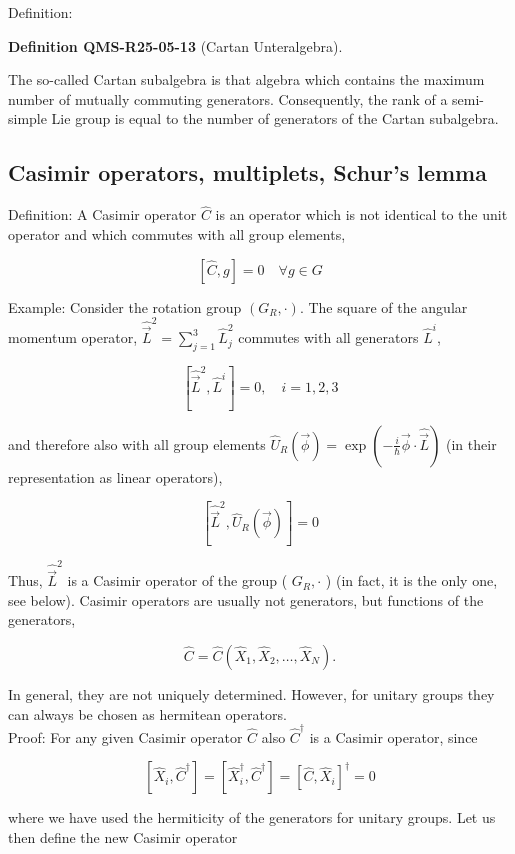 \documentclass[10pt, letterpaper]{article}
\newcommand{\CustomHeading}[3]{%
  \par\medskip\noindent%
  \textbf{#1 #2} \textnormal{(#3)}.\enskip%
}
\newenvironment{DEF}[2]{\begin{unitbox}\CustomHeading{Definition}{#1}{#2}}{\end{unitbox}}
\begin{document}
Definition: 


\begin{DEF}{QMS-R25-05-13}{Cartan Unteralgebra}
The so-called Cartan subalgebra is that algebra which contains the maximum number of mutually commuting generators. Consequently, the rank of a semi-simple Lie group is equal to the number of generators of the Cartan subalgebra.
\end{DEF}




\subsection{Casimir operators, multiplets, Schur's lemma}


Definition: A Casimir operator $\hat{C}$ is an operator which is not identical to the unit operator and which commutes with all group elements,

$$
[\hat{C}, g]=0 \quad \forall g \in G
$$

Example: Consider the rotation group $\left(G_{R}, \cdot\right)$. The square of the angular momentum operator, $\hat{\vec{L}}^{2}=\sum_{j=1}^{3} \hat{L}_{j}^{2}$ commutes with all generators $\hat{L}^{i}$,

$$
\left[\hat{\vec{L}}^{2}, \hat{L}^{i}\right]=0, \quad i=1,2,3
$$

and therefore also with all group elements $\hat{U}_{R}(\vec{\phi})=\exp \left(-\frac{i}{\hbar} \vec{\phi} \cdot \hat{\vec{L}}\right)$ (in their representation as linear operators),

$$
\left[\hat{\vec{L}}^{2}, \hat{U}_{R}(\vec{\phi})\right]=0
$$

Thus, $\hat{\vec{L}}^{2}$ is a Casimir operator of the group ( $G_{R}, \cdot$ ) (in fact, it is the only one, see below). Casimir operators are usually not generators, but functions of the generators,

$$
\hat{C}=\hat{C}\left(\hat{X}_{1}, \hat{X}_{2}, \ldots, \hat{X}_{N}\right) .
$$

In general, they are not uniquely determined. However, for unitary groups they can always be chosen as hermitean operators.\\
Proof: For any given Casimir operator $\hat{C}$ also $\hat{C}^{\dagger}$ is a Casimir operator, since

$$
\left[\hat{X}_{i}, \hat{C}^{\dagger}\right]=\left[\hat{X}_{i}^{\dagger}, \hat{C}^{\dagger}\right]=\left[\hat{C}, \hat{X}_{i}\right]^{\dagger}=0
$$

where we have used the hermiticity of the generators for unitary groups. Let us then define the new Casimir operator
\end{document}
